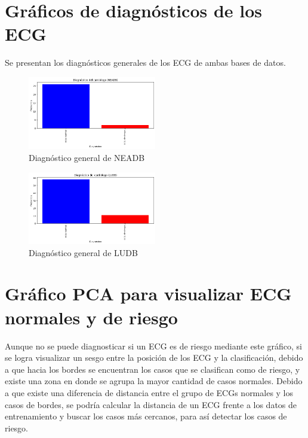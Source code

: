 \documentclass[conference]{IEEEtran}
\begin{document}
\section{Gráficos de diagnósticos de los ECG }

Se presentan los diagnósticos generales de los ECG de ambas bases de datos.

\begin{figure}[H]
    \includegraphics[width=0.5\textwidth]{./graficos/diagnosticoGeneralNEADB.png}
    \caption{Diagnóstico general de NEADB}
\end{figure}

\begin{figure}[H]
    \includegraphics[width=0.5\textwidth]{./graficos/diagnosticoGeneraLUDB.png}
    \caption{Diagnóstico general de LUDB}
\end{figure}

\section{Gráfico PCA para visualizar ECG normales y de riesgo}

Aunque no se puede diagnosticar si un ECG es de riesgo mediante este gráfico, si se logra visualizar 
un sesgo entre la posición de los ECG y la clasificación, debido a que hacia los bordes se encuentran
 los casos que se clasifican como de riesgo, y existe una zona en donde se agrupa la mayor cantidad de
  casos normales. Debido a que existe una diferencia de distancia entre el grupo de ECGs normales y los
   casos de bordes, se podría calcular la distancia de un ECG frente a los datos de entrenamiento y buscar 
   los casos más cercanos, para así detectar los casos de riesgo.
\end{document}
